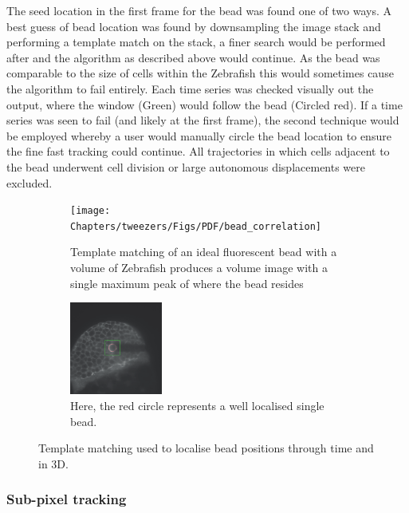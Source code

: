 The seed location in the first frame for the bead was found one of two ways.
A best guess of bead location was found by downsampling the image stack and performing a template match on the stack, a finer search would be performed after and the algorithm as described above would continue.
As the bead was comparable to the size of cells within the Zebrafish this would sometimes cause the algorithm to fail entirely.
Each time series was checked visually out the output, where the window (Green) would follow the bead (Circled red).
If a time series was seen to fail (and likely at the first frame), the second technique would be employed whereby a user would manually circle the bead location to ensure the fine fast tracking could continue.
All trajectories in which cells adjacent to the bead underwent cell division or large autonomous displacements were excluded.


\begin{figure}[t!]
    \centering
    \begin{subfigure}[t]{0.4\textwidth}
        \centering
        \texttt{[image: Chapters/tweezers/Figs/PDF/bead\_correlation]}
        \caption{Template matching of an ideal fluorescent bead with a volume of Zebrafish produces a volume image with a single maximum peak of where the bead resides}
        \label{fig:bead_correlation}
    \end{subfigure}%
    \hspace{0.05\textwidth}
    \begin{subfigure}[t]{0.4\textwidth}
        \centering
        \includegraphics[height=1.2in]{Chapters/tweezers/Figs/PDF/bead_tracked}
        \caption{Here, the red circle represents a well localised single bead.}
        \label{fig:bead_tracked}
    \end{subfigure}
    \caption{Template matching used to localise bead positions through time and in 3D.  }
\end{figure}

\subsubsection{Sub-pixel tracking}

